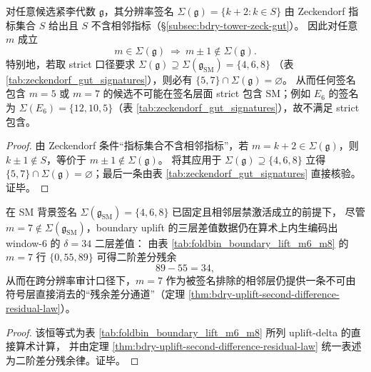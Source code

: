 \begin{corollary}\label{cor:zeckendorf-no-adjacent-strict-inclusion-impossible}
对任意候选紧李代数 \(\mathfrak g\)，其分辨率签名 \(\Sigma(\mathfrak g)=\{k+2:k\in S\}\) 由 Zeckendorf 指标集合 \(S\) 给出且 \(S\) 不含相邻指标（\S\ref{subsec:bdry-tower-zeck-gut}）。
因此对任意 \(m\) 成立
\[
m\in\Sigma(\mathfrak g)\ \Longrightarrow\ m\pm 1\notin\Sigma(\mathfrak g).
\]
特别地，若取 strict 口径要求
\(
\Sigma(\mathfrak g)\supseteq \Sigma(\mathfrak g_{\mathrm{SM}})=\{4,6,8\}
\)
（表 \ref{tab:zeckendorf_gut_signatures}），则必有
\(
\{5,7\}\cap \Sigma(\mathfrak g)=\varnothing
\)。
从而任何签名包含 \(m=5\) 或 \(m=7\) 的候选不可能在签名层面 strict 包含 SM；例如 \(E_6\) 的签名为 \(\Sigma(E_6)=\{12,10,5\}\)（表 \ref{tab:zeckendorf_gut_signatures}），故不满足 strict 包含。
\end{corollary}
\begin{proof}
由 Zeckendorf 条件“指标集合不含相邻指标”，若 \(m=k+2\in\Sigma(\mathfrak g)\)，则 \(k\pm 1\notin S\)，等价于 \(m\pm 1\notin \Sigma(\mathfrak g)\)。
将其应用于 \(\Sigma(\mathfrak g)\supseteq\{4,6,8\}\) 立得 \(\{5,7\}\cap\Sigma(\mathfrak g)=\varnothing\)；最后一条由表 \ref{tab:zeckendorf_gut_signatures} 直接核验。证毕。
\end{proof}

\begin{proposition}[相邻层禁激活下的 uplift 残余中介：\texorpdfstring{$m=7$}{m=7} 的二阶差分回注]\label{prop:sm-uplift-residual-mediator-m7}
在 SM 背景签名 \(\Sigma(\mathfrak g_{\mathrm{SM}})=\{4,6,8\}\) 已固定且相邻层禁激活成立的前提下，
尽管 \(m=7\notin\Sigma(\mathfrak g_{\mathrm{SM}})\)，boundary uplift 的三层差值数据仍在算术上内生编码出 window-\(6\) 的 \(\delta=34\) 二层差值：
由表 \ref{tab:foldbin_boundary_lift_m6_m8} 的 \(m=7\) 行 \(\{0,55,89\}\) 可得二阶差分残余
\[
89-55=34,
\]
从而在跨分辨率审计口径下，\(m=7\) 作为被签名排除的相邻层仍提供一条不可由符号层直接消去的“残余差分通道”（定理 \ref{thm:bdry-uplift-second-difference-residual-law}）。
\end{proposition}
\begin{proof}
该恒等式为表 \ref{tab:foldbin_boundary_lift_m6_m8} 所列 uplift-delta 的直接算术计算，
并由定理 \ref{thm:bdry-uplift-second-difference-residual-law} 统一表述为二阶差分残余律。证毕。
\end{proof}


